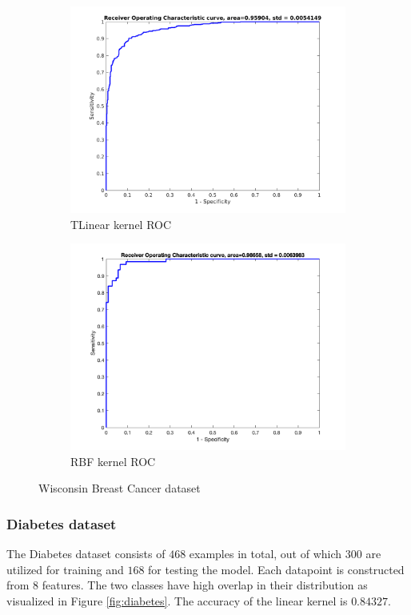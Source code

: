 \documentclass[a4paper, 11pt, one column]{article}
\begin{document}
\begin{figure}[hbt]
\begin{subfigure}{0.45\linewidth}
            \includegraphics[width=\linewidth]{images/breast_linear_ROC.png}
            \caption{TLinear kernel ROC}
        \end{subfigure}
        \centering
        \begin{subfigure}{0.45\linewidth}
            \includegraphics[width=\linewidth]{images/breast_RBF_ROC.png}
            \caption{RBF kernel ROC}
        \end{subfigure}
        \caption{Wisconsin Breast Cancer dataset}
        \label{fig:breastmisc}
\end{figure}

\subsubsection{Diabetes dataset}
The Diabetes dataset consists of $468$ examples in total, out of which $300$ are utilized for training and $168$ for testing the model. Each datapoint is constructed from $8$ features. The two classes have high overlap in their distribution as visualized in Figure \ref{fig:diabetes}. The accuracy of the linear kernel is $0.84327$.
\end{document}
